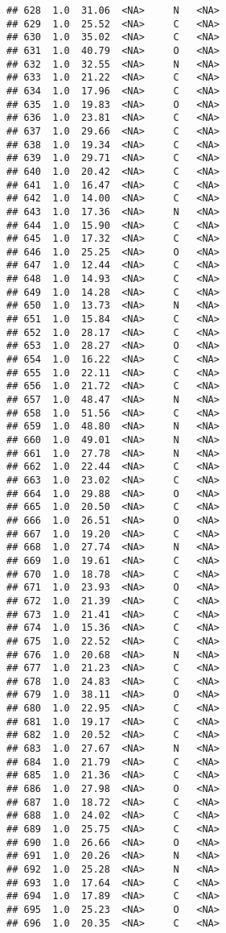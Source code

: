 \documentclass[
]{article}
\begin{document}
\begin{verbatim}
## 628  1.0  31.06  <NA>     N   <NA>
## 629  1.0  25.52  <NA>     C   <NA>
## 630  1.0  35.02  <NA>     C   <NA>
## 631  1.0  40.79  <NA>     O   <NA>
## 632  1.0  32.55  <NA>     N   <NA>
## 633  1.0  21.22  <NA>     C   <NA>
## 634  1.0  17.96  <NA>     C   <NA>
## 635  1.0  19.83  <NA>     O   <NA>
## 636  1.0  23.81  <NA>     C   <NA>
## 637  1.0  29.66  <NA>     C   <NA>
## 638  1.0  19.34  <NA>     C   <NA>
## 639  1.0  29.71  <NA>     C   <NA>
## 640  1.0  20.42  <NA>     C   <NA>
## 641  1.0  16.47  <NA>     C   <NA>
## 642  1.0  14.00  <NA>     C   <NA>
## 643  1.0  17.36  <NA>     N   <NA>
## 644  1.0  15.90  <NA>     C   <NA>
## 645  1.0  17.32  <NA>     C   <NA>
## 646  1.0  25.25  <NA>     O   <NA>
## 647  1.0  12.44  <NA>     C   <NA>
## 648  1.0  14.93  <NA>     C   <NA>
## 649  1.0  14.28  <NA>     C   <NA>
## 650  1.0  13.73  <NA>     N   <NA>
## 651  1.0  15.84  <NA>     C   <NA>
## 652  1.0  28.17  <NA>     C   <NA>
## 653  1.0  28.27  <NA>     O   <NA>
## 654  1.0  16.22  <NA>     C   <NA>
## 655  1.0  22.11  <NA>     C   <NA>
## 656  1.0  21.72  <NA>     C   <NA>
## 657  1.0  48.47  <NA>     N   <NA>
## 658  1.0  51.56  <NA>     C   <NA>
## 659  1.0  48.80  <NA>     N   <NA>
## 660  1.0  49.01  <NA>     N   <NA>
## 661  1.0  27.78  <NA>     N   <NA>
## 662  1.0  22.44  <NA>     C   <NA>
## 663  1.0  23.02  <NA>     C   <NA>
## 664  1.0  29.88  <NA>     O   <NA>
## 665  1.0  20.50  <NA>     C   <NA>
## 666  1.0  26.51  <NA>     O   <NA>
## 667  1.0  19.20  <NA>     C   <NA>
## 668  1.0  27.74  <NA>     N   <NA>
## 669  1.0  19.61  <NA>     C   <NA>
## 670  1.0  18.78  <NA>     C   <NA>
## 671  1.0  23.93  <NA>     O   <NA>
## 672  1.0  21.39  <NA>     C   <NA>
## 673  1.0  21.41  <NA>     C   <NA>
## 674  1.0  15.36  <NA>     C   <NA>
## 675  1.0  22.52  <NA>     C   <NA>
## 676  1.0  20.68  <NA>     N   <NA>
## 677  1.0  21.23  <NA>     C   <NA>
## 678  1.0  24.83  <NA>     C   <NA>
## 679  1.0  38.11  <NA>     O   <NA>
## 680  1.0  22.95  <NA>     C   <NA>
## 681  1.0  19.17  <NA>     C   <NA>
## 682  1.0  20.52  <NA>     C   <NA>
## 683  1.0  27.67  <NA>     N   <NA>
## 684  1.0  21.79  <NA>     C   <NA>
## 685  1.0  21.36  <NA>     C   <NA>
## 686  1.0  27.98  <NA>     O   <NA>
## 687  1.0  18.72  <NA>     C   <NA>
## 688  1.0  24.02  <NA>     C   <NA>
## 689  1.0  25.75  <NA>     C   <NA>
## 690  1.0  26.66  <NA>     O   <NA>
## 691  1.0  20.26  <NA>     N   <NA>
## 692  1.0  25.28  <NA>     N   <NA>
## 693  1.0  17.64  <NA>     C   <NA>
## 694  1.0  17.89  <NA>     C   <NA>
## 695  1.0  25.23  <NA>     O   <NA>
## 696  1.0  20.35  <NA>     C   <NA>

\end{verbatim}
\end{document}

